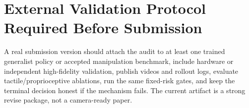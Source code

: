 \documentclass{article}
\begin{document}
\section{External Validation Protocol Required Before Submission}
A real submission version should attach the audit to at least one trained generalist policy or accepted manipulation benchmark, include hardware or independent high-fidelity validation, publish videos and rollout logs, evaluate tactile/proprioceptive ablations, run the same fixed-risk gates, and keep the terminal decision honest if the mechanism fails. The current artifact is a strong revise package, not a camera-ready paper.

\begingroup
\raggedright


\endgroup
\end{document}
